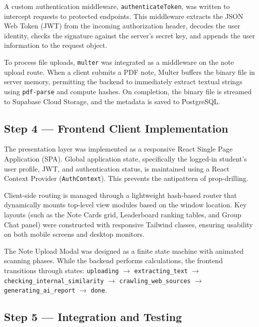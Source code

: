 \documentclass[12,Times new Roman,a4paper]{report}
\begin{document}
A custom authentication middleware, \texttt{authenticateToken}, was written to intercept requests to protected endpoints. This middleware extracts the JSON Web Token (JWT) from the incoming authorization header, decodes the user identity, checks the signature against the server's secret key, and appends the user information to the request object. 

To process file uploads, \texttt{multer} was integrated as a middleware on the note upload route. When a client submits a PDF note, Multer buffers the binary file in server memory, permitting the backend to immediately extract textual strings using \texttt{pdf-parse} and compute hashes. On completion, the binary file is streamed to Supabase Cloud Storage, and the metadata is saved to PostgreSQL.

\subsection{Step 4 — Frontend Client Implementation}

The presentation layer was implemented as a responsive React Single Page Application (SPA). Global application state, specifically the logged-in student's user profile, JWT, and authentication status, is maintained using a React Context Provider (\texttt{AuthContext}). This prevents the antipattern of prop-drilling.

Client-side routing is managed through a lightweight hash-based router that dynamically mounts top-level view modules based on the window location. Key layouts (such as the Note Cards grid, Leaderboard ranking tables, and Group Chat panel) were constructed with responsive Tailwind classes, ensuring usability on both mobile screens and desktop monitors.

The Note Upload Modal was designed as a finite state machine with animated scanning phases. While the backend performs calculations, the frontend transitions through states: \texttt{uploading} $\rightarrow$ \texttt{extracting\_text} $\rightarrow$ \texttt{checking\_internal\_similarity} $\rightarrow$ \texttt{crawling\_web\_sources} $\rightarrow$ \texttt{generating\_ai\_report} $\rightarrow$ \texttt{done}.

\subsection{Step 5 — Integration and Testing}
\end{document}
